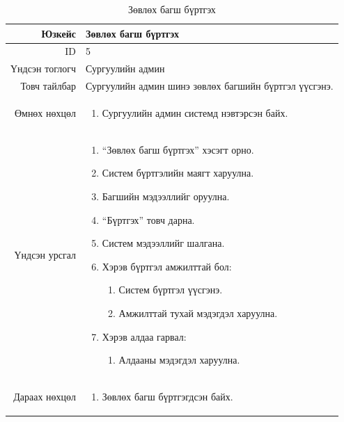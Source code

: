 \begin{longtable}{|r|p{11cm}|}
\caption{Зөвлөх багш бүртгэх}
\label{table:usecase5}\\ \hline
Юзкейс & Зөвлөх багш бүртгэх \\ \hline
ID & 5 \\ \hline
Үндсэн тоглогч & Сургуулийн админ \\ \hline
Товч тайлбар & Сургуулийн админ шинэ
зөвлөх багшийн бүртгэл үүсгэнэ. \\ \hline
Өмнөх нөхцөл &
\begin{enumerate}[nosep]
\item Сургуулийн админ системд нэвтэрсэн байх.
\end{enumerate} \\ \hline
Үндсэн урсгал &
\begin{enumerate}[nosep]
\item ``Зөвлөх багш бүртгэх'' хэсэгт орно.
\item Систем бүртгэлийн маягт харуулна.
\item Багшийн мэдээллийг оруулна.
\item ``Бүртгэх'' товч дарна.
\item Систем мэдээллийг шалгана.
\item Хэрэв бүртгэл амжилттай бол:
\begin{enumerate}[nosep,label*=\arabic*.]
\item Систем бүртгэл үүсгэнэ.
\item Амжилттай тухай мэдэгдэл харуулна.
\end{enumerate}
\item Хэрэв алдаа гарвал:
\begin{enumerate}[nosep,label*=\arabic*.]
\item Алдааны мэдэгдэл харуулна.
\end{enumerate}
\end{enumerate} \\ \hline
Дараах нөхцөл &
\begin{enumerate}[nosep]
\item Зөвлөх багш бүртгэгдсэн байх.
\end{enumerate} \\ \hline
\end{longtable}

